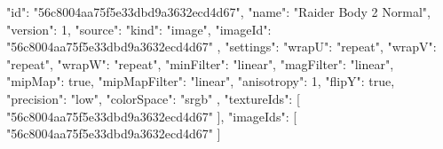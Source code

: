 {
  "id": "56c8004aa75f5e33dbd9a3632ecd4d67",
  "name": "Raider Body 2 Normal",
  "version": 1,
  "source": {
    "kind": "image",
    "imageId": "56c8004aa75f5e33dbd9a3632ecd4d67"
  },
  "settings": {
    "wrapU": "repeat",
    "wrapV": "repeat",
    "wrapW": "repeat",
    "minFilter": "linear",
    "magFilter": "linear",
    "mipMap": true,
    "mipMapFilter": "linear",
    "anisotropy": 1,
    "flipY": true,
    "precision": "low",
    "colorSpace": "srgb"
  },
  "textureIds": [
    "56c8004aa75f5e33dbd9a3632ecd4d67"
  ],
  "imageIds": [
    "56c8004aa75f5e33dbd9a3632ecd4d67"
  ]
}
